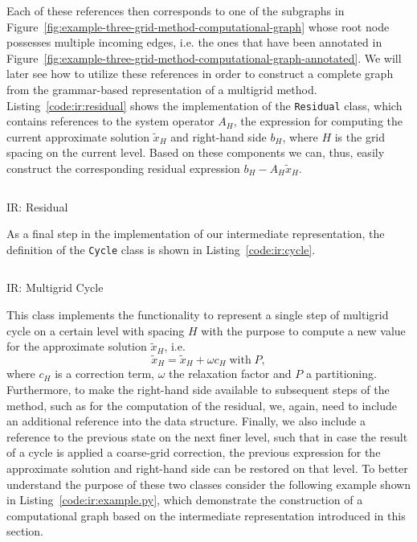 Each of these references then corresponds to one of the subgraphs in Figure~\ref{fig:example-three-grid-method-computational-graph} whose root node possesses multiple incoming edges, i.e. the ones that have been annotated in Figure~\ref{fig:example-three-grid-method-computational-graph-annotated}.
We will later see how to utilize these references in order to construct a complete graph from the grammar-based representation of a multigrid method.
Listing~\ref{code:ir:residual} shows the implementation of the \texttt{Residual} class, which contains references to the system operator $A_H$, the expression for computing the current approximate solution $\tilde{x}_H$ and right-hand side $b_H$, where $H$ is the grid spacing on the current level.
Based on these components we can, thus, easily construct the corresponding residual expression $b_H - A_H \tilde{x}_H$.
\begin{listing}
	\inputminted{python}{evostencils/ir/residual.py}
	\caption{IR: Residual}
	\label{code:ir:residual}
\end{listing}
As a final step in the implementation of our intermediate representation, the definition of the \texttt{Cycle} class is shown in Listing~\ref{code:ir:cycle}.
\begin{listing}
	\inputminted{python}{evostencils/ir/cycle.py}
	\caption{IR: Multigrid Cycle}
	\label{code:ir:cycle}
\end{listing}
This class implements the functionality to represent a single step of multigrid cycle on a certain level with spacing $H$ with the purpose to compute a new value for the approximate solution $\tilde{x}_H$, i.e.
\begin{equation}
	\tilde{x}_H = \tilde{x}_H + \omega c_H \; \text{with} \; P,
\end{equation}
where $c_H$ is a correction term, $\omega$ the relaxation factor and $P$ a partitioning.
Furthermore, to make the right-hand side available to subsequent steps of the method, such as for the computation of the residual, we, again, need to include an additional reference into the data structure.
Finally, we also include a reference to the previous state on the next finer level, such that in case the result of a cycle is applied a coarse-grid correction, the previous expression for the approximate solution and right-hand side can be restored on that level.
To better understand the purpose of these two classes consider the following example shown in Listing~\ref{code:ir:example.py}, which demonstrate the construction of a computational graph based on the intermediate representation introduced in this section.
